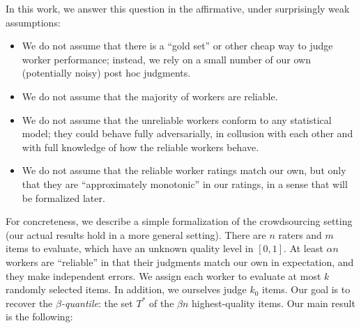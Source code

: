 In this work, we answer this question in the affirmative, under surprisingly 
weak assumptions:
\begin{itemize}[itemsep=2pt,topsep=0pt,parsep=0pt,partopsep=0pt,leftmargin=30pt]
\item We do not assume that there is a ``gold set'' or other cheap way to judge 
      worker performance; instead, we rely on a small number of our own (potentially noisy) post hoc judgments. 
\item We do not assume that the majority of workers are reliable.
\item We do not assume that the unreliable workers conform to any statistical 
      model; they could behave fully adversarially, in collusion with each other 
      and with full knowledge of how the reliable workers behave.
\item We do not assume that the reliable worker ratings match our own, but only that they are 
      ``approximately monotonic'' in our ratings, in a sense that will be 
      formalized later.
\end{itemize}
For concreteness, we describe a simple formalization of the crowdsourcing 
setting (our actual results hold in a more general setting). 
There are $n$ raters and $m$ items to evaluate, which have an unknown 
quality level in $[0,1]$. At least $\alpha n$ workers are ``reliable'' in that 
their judgments match our own in expectation, and they make independent errors.
We assign each worker to evaluate at most $k$ randomly selected items. 
In addition, we ourselves judge $k_0$ items. Our goal is to 
recover the \emph{$\beta$-quantile}: the set $T^*$ of the $\beta n$ highest-quality items. 
%
Our main result is the following:



